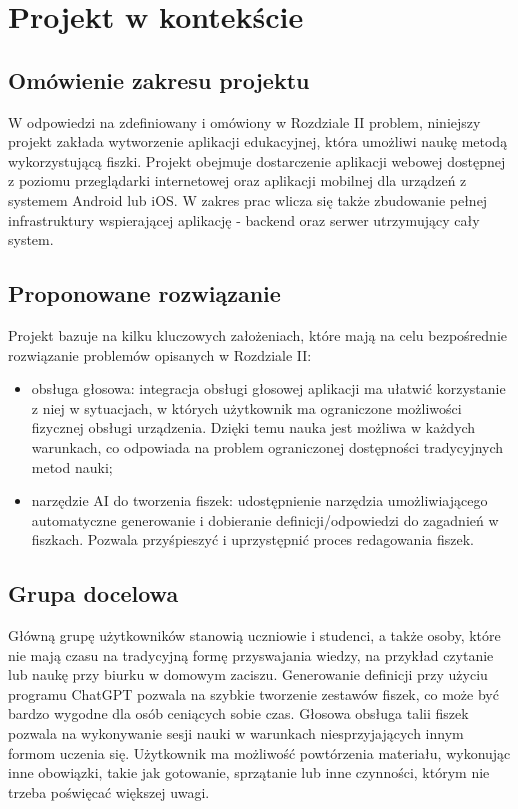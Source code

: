 \chapter{Projekt w kontekście}

\section{Omówienie zakresu projektu}

W odpowiedzi na zdefiniowany i omówiony w Rozdziale II problem, niniejszy projekt zakłada wytworzenie aplikacji edukacyjnej, która umożliwi naukę metodą wykorzystującą fiszki. Projekt obejmuje dostarczenie aplikacji webowej dostępnej z poziomu przeglądarki internetowej oraz aplikacji mobilnej dla urządzeń z systemem Android lub iOS. W zakres prac wlicza się także zbudowanie pełnej infrastruktury wspierającej aplikację - backend oraz serwer utrzymujący cały system.

\section{Proponowane rozwiązanie}

Projekt bazuje na kilku kluczowych założeniach, które mają na celu bezpośrednie rozwiązanie problemów opisanych w Rozdziale II:

\begin{itemize}
    \item obsługa głosowa: integracja obsługi głosowej aplikacji ma ułatwić korzystanie z niej w sytuacjach, w których użytkownik ma ograniczone możliwości fizycznej obsługi urządzenia. Dzięki temu nauka jest możliwa w każdych warunkach, co odpowiada na problem ograniczonej dostępności tradycyjnych metod nauki;
    \item narzędzie AI do tworzenia fiszek: udostępnienie narzędzia umożliwiającego automatyczne generowanie i dobieranie definicji/odpowiedzi do zagadnień w fiszkach. Pozwala przyśpieszyć i uprzystępnić proces redagowania fiszek.
\end{itemize}

\section{Grupa docelowa}

Główną grupę użytkowników stanowią uczniowie i studenci, a także osoby, które nie mają czasu na tradycyjną formę przyswajania wiedzy, na przykład czytanie lub naukę przy biurku w domowym zaciszu. Generowanie definicji przy użyciu programu ChatGPT pozwala na szybkie tworzenie zestawów fiszek, co może być bardzo wygodne dla osób ceniących sobie czas. Głosowa obsługa talii fiszek pozwala na wykonywanie sesji nauki w warunkach niesprzyjających innym formom uczenia się. Użytkownik ma możliwość powtórzenia materiału, wykonując inne obowiązki, takie jak gotowanie, sprzątanie lub inne czynności, którym nie trzeba poświęcać większej uwagi.

